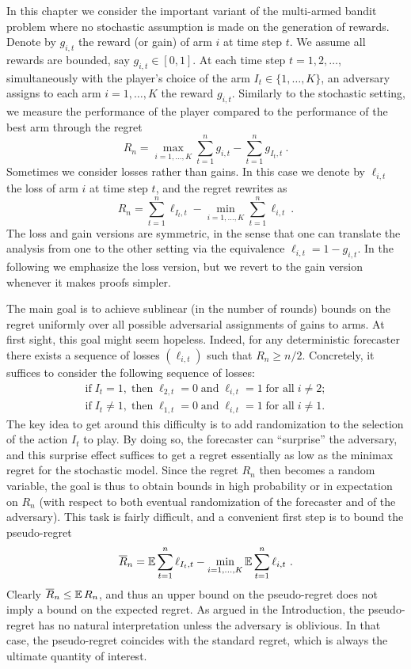 In this chapter we consider the important variant of the multi-armed bandit problem where no stochastic assumption is made on the generation of rewards. Denote by $g_{i,t}$ the reward (or gain) of arm $i$ at time step $t$. We assume all rewards are bounded, say $g_{i,t}\in [0,1]$. At each time step $t=1, 2,\hdots$, simultaneously with the player's choice of the arm $I_t \in \{1,\hdots,K\}$, an adversary assigns to each arm $i=1,\dots,K$ the reward $g_{i,t}$. Similarly to the stochastic setting, we measure the performance of the player compared to the performance of the best arm through the regret
$$R_n = \max_{i=1,\hdots,K} \sum_{t=1}^n g_{i,t} - \sum_{t=1}^n g_{I_t,t}~.$$
Sometimes we consider losses rather than gains. In this case we denote by $\ell_{i,t}$ the loss of arm $i$ at time step $t$, and the regret rewrites as
$$R_n = \sum_{t=1}^n \ell_{I_t,t} - \min_{i=1,\hdots,K} \sum_{t=1}^n \ell_{i,t}~.$$
The loss and gain versions are symmetric, in the sense that one can translate the analysis from one to the other setting via the equivalence $\ell_{i,t} = 1 - g_{i,t}$. In the following we emphasize the loss version, but we revert to the gain version whenever it makes proofs simpler.

The main goal is to achieve sublinear (in the number of rounds) bounds on the regret uniformly over all possible adversarial assignments of gains to arms. At first sight, this goal might seem hopeless. Indeed, for any deterministic forecaster there exists a sequence of losses $(\ell_{i,t})$ such that $R_n \geq n/2$. Concretely, it suffices to consider the following sequence of losses:
$$
\begin{array}{c}
\text{if} \; I_t = 1, \; \text{then} \; \ell_{2,t} = 0 \; \text{and} \; \ell_{i,t}=1 \; \text{for all} \; i \neq 2;
\\
\text{if} \; I_t \neq 1, \; \text{then} \; \ell_{1,t} = 0 \; \text{and} \; \ell_{i,t}=1 \; \text{for all} \; i \neq 1.
\end{array}
$$
The key idea to get around this difficulty is to add randomization to the selection of the action $I_t$ to play. By doing so, the forecaster can ``surprise'' the adversary, and this surprise effect suffices to get a regret essentially as low as the minimax regret for the stochastic model. Since the regret $R_n$ then becomes a random variable, the goal is thus to obtain bounds in high probability or in expectation on $R_n$ (with respect to both eventual randomization of the forecaster and of the adversary). This task is fairly difficult, and a convenient first step is to bound the pseudo-regret
\begin{equation} \label{eq:pseudoregretadv}
\overline{R}_n = \mathbb{E} \sum_{t=1}^n \ell_{I_t,t} - \min_{i=1,\hdots,K} \mathbb{E} \sum_{t=1}^n \ell_{i,t}~.
\end{equation}
Clearly $\overline{R}_n \leq \mathbb{E}\,R_n$, and thus an upper bound on the pseudo-regret does not imply a bound on the expected regret. As argued in the Introduction, the pseudo-regret has no natural interpretation unless the adversary is oblivious. In that case, the pseudo-regret coincides with the standard regret, which is always the ultimate quantity of interest.


